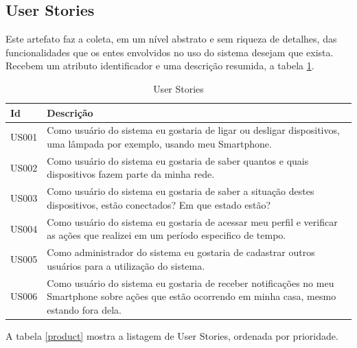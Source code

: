 \subsection{User Stories}
Este artefato faz a coleta, em um nível abstrato e sem riqueza de detalhes, das funcionalidades que os entes envolvidos no uso do sistema desejam que exista. Recebem um atributo identificador e uma descrição resumida, a tabela \ref{user-stories}.

\begin{table}[H]
   \caption{User Stories}
   \label{user-stories}
{
   \begin{tabularx}{\linewidth}{lX}
   \toprule
   Id & Descrição \\
   \midrule \midrule
   
    US001 & Como usuário do sistema eu gostaria de ligar ou desligar dispositivos, uma lâmpada por exemplo, usando meu Smartphone. \\

    US002 & Como usuário do sistema eu gostaria de saber quantos e quais dispositivos fazem parte da minha rede. \\

    US003 & Como usuário do sistema eu gostaria de saber a situação destes dispositivos, estão conectados? Em que estado estão? \\

    US004 & Como usuário do sistema eu gostaria de acessar meu perfil e verificar as ações que realizei em um período especifico de tempo. \\

    US005 & Como administrador do sistema eu gostaria de cadastrar outros usuários para a utilização do sistema. \\

    US006 & Como usuário do sistema eu gostaria de receber notificações no meu Smartphone sobre ações que estão ocorrendo em minha casa, mesmo estando fora dela. \\
   
   \bottomrule
   \end{tabularx}
}{
}
\end{table}

A tabela \ref{product} mostra a listagem de User Stories, ordenada por prioridade.

